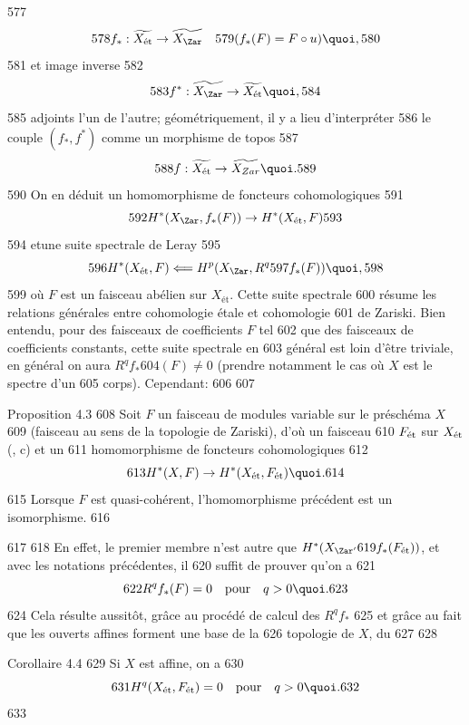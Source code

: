    577	$$
   578	f_{\ast} : \widetilde{X_{\text{ét}}} \to \widetilde{X_{\Zar}}\quad
   579	(f_{\ast} (F) = F \circ u){\quoi},
   580	$$
   581	et image inverse
   582	$$
   583	f^{\ast} : \widetilde{X_{\Zar}} \to \widetilde{X_{\text{ét}}}{\quoi},
   584	$$
   585	adjoints l'un de l'autre; géométriquement, il y a lieu d'interpréter
   586	le couple $(f_{\ast}, f^{\ast})$ comme un morphisme de topos
   587	$$
   588	f : \widetilde{X_{\text{ét}}} \to \widetilde{X_{Zar}}{\quoi}.
   589	$$
   590	On en déduit un homomorphisme de foncteurs cohomologiques
   591	$$
   592	H^{\ast} (X_{\Zar}, f_{\ast} (F)) \to H^{\ast} (X_{\text{ét}}, F)
   593	$$
   594	et\pageoriginale une suite spectrale de Leray
   595	$$
   596	H^{\ast} (X_{\text{ét}}, F) \Longleftarrow H^{p} (X_{\Zar}, R^q
   597	f_{\ast} (F)){\quoi},
   598	$$
   599	où $F$ est un faisceau abélien sur $X_{\text{ét}}$. Cette suite spectrale
   600	résume les relations générales entre cohomologie étale et cohomologie
   601	de Zariski. Bien entendu, pour des faisceaux de coefficients $F$ tel
   602	que des faisceaux de coefficients constants, cette suite spectrale en
   603	général est loin d'être triviale, \ie en général on aura $R^q f_{\ast}
   604	(F) \neq 0$  (prendre notamment le cas où $X$ est le spectre d'un
   605	corps). Cependant:
   606	
   607	\begin{enonce*}{Proposition 4.3}
   608	Soit $F$ un faisceau de modules variable sur le préschéma $X$
   609	(faisceau au sens de la topologie de Zariski), d'où un faisceau
   610	$F_{\text{\rm ét}}$ sur $X_{\text{\rm ét}}$ (, c) et un
   611	homomorphisme de foncteurs cohomologiques
   612	$$
   613	H^{\ast} (X, F) \to H^{\ast} (X_{\text{\rm ét}}, F_{\text{\rm ét}}){\quoi}.
   614	$$
   615	Lorsque $F$ est quasi-cohérent, l'homomorphisme précédent est un isomorphisme.
   616	\end{enonce*}
   617	
   618	En effet, le premier membre n'est autre que $H^{\ast} (X_{\Zar'}
   619	f_{\ast} (F_{\text{ét}}))$, et avec les notations précédentes, il
   620	suffit de prouver qu'on a
   621	$$
   622	R^q f_{\ast} (F) = 0\quad \mbox{pour}\quad q > 0{\quoi}.
   623	$$
   624	Cela résulte aussitôt, grâce au procédé de calcul des $R^q f_{\ast}$
   625	et grâce au fait que les ouverts affines forment une base de la
   626	topologie de $X$, du
   627	
   628	\begin{enonce*}{Corollaire 4.4}
   629	Si $X$ est affine, on a
   630	$$
   631	H^{q} (X_{\text{\rm ét}}, F_{\text{\rm ét}}) = 0\quad \mbox{pour}\quad q > 0{\quoi}.
   632	$$
   633	\end{enonce*}
